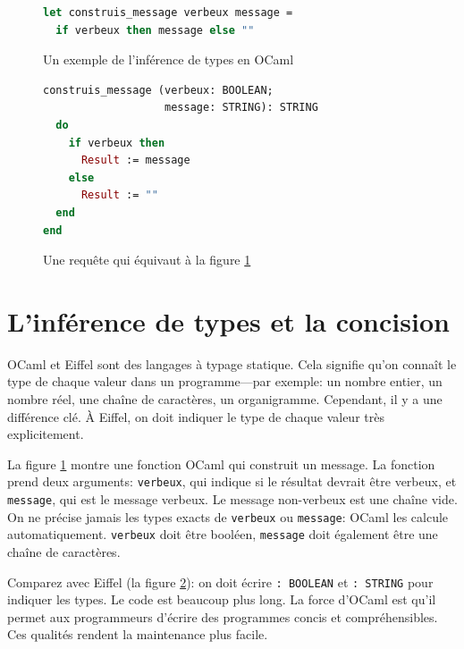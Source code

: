 \documentclass[french]{report}
\begin{document}
\begin{figure}[h]
	\begin{lstlisting}[language=Caml]
let construis_message verbeux message = 
  if verbeux then message else ""
	\end{lstlisting}
	
	\caption{Un exemple de l'inférence de types en OCaml\protect\footnotemark}
	\label{fig:type-inference-code}
\end{figure}


\begin{figure}[h]
	\begin{lstlisting}[language=Eiffel]
construis_message (verbeux: BOOLEAN; 
                   message: STRING): STRING
  do
    if verbeux then
      Result := message
    else
      Result := ""
  end
end
	\end{lstlisting}
	\caption{Une requête qui équivaut à la figure \ref{fig:type-inference-code}}
	\label{fig:without-type-inference-code}
\end{figure}

\section{L'inférence de types et la concision}

OCaml et Eiffel sont des langages à typage statique. Cela signifie qu'on connaît le type de chaque valeur dans un programme---par exemple: un nombre entier, un nombre réel, une chaîne de caractères, un organigramme. Cependant, il y a une différence clé. À Eiffel, on doit indiquer le type de chaque valeur très explicitement.

La figure \ref{fig:type-inference-code} montre une \gls{fonction} OCaml qui construit un message. La \gls{fonction} prend deux arguments: \texttt{verbeux}, qui indique si le résultat devrait être verbeux, et \texttt{message}, qui est le message verbeux. Le message non-verbeux est une chaîne vide. On ne précise jamais les types exacts de \texttt{verbeux} ou \texttt{message}: OCaml les calcule automatiquement. \texttt{verbeux} doit être booléen, \texttt{message} doit également être une chaîne de caractères.

Comparez avec Eiffel (la figure \ref{fig:without-type-inference-code}): on doit écrire \texttt{: BOOLEAN} et \texttt{: STRING} pour indiquer les types. Le code est beaucoup plus long. La force d'OCaml est qu'il permet aux programmeurs d'écrire des programmes concis et compréhensibles. Ces qualités rendent la maintenance plus facile.
\end{document}
